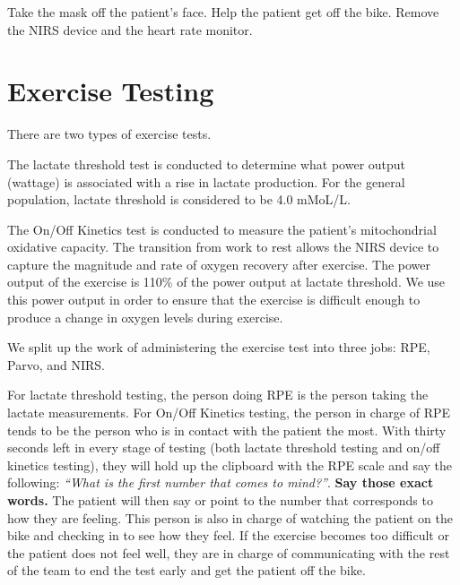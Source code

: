 \documentclass[
]{book}
\begin{document}
Take the mask off the patient's face. Help the patient get off the bike. Remove the NIRS device and the heart rate monitor.

\hypertarget{ExerciseTesting}{%
\chapter{Exercise Testing}\label{ExerciseTesting}}

There are two types of exercise tests.

The lactate threshold test is conducted to determine what power output (wattage) is associated with a rise in lactate production. For the general population, lactate threshold is considered to be 4.0 mMoL/L.

The On/Off Kinetics test is conducted to measure the patient's mitochondrial oxidative capacity. The transition from work to rest allows the NIRS device to capture the magnitude and rate of oxygen recovery after exercise. The power output of the exercise is 110\% of the power output at lactate threshold. We use this power output in order to ensure that the exercise is difficult enough to produce a change in oxygen levels during exercise.

We split up the work of administering the exercise test into three jobs: RPE, Parvo, and NIRS.

For lactate threshold testing, the person doing RPE is the person taking the lactate measurements. For On/Off Kinetics testing, the person in charge of RPE tends to be the person who is in contact with the patient the most. With thirty seconds left in every stage of testing (both lactate threshold testing and on/off kinetics testing), they will hold up the clipboard with the RPE scale and say the following: \emph{``What is the first number that comes to mind?''}. \textbf{Say those exact words.} The patient will then say or point to the number that corresponds to how they are feeling. This person is also in charge of watching the patient on the bike and checking in to see how they feel. If the exercise becomes too difficult or the patient does not feel well, they are in charge of communicating with the rest of the team to end the test early and get the patient off the bike.
\end{document}
